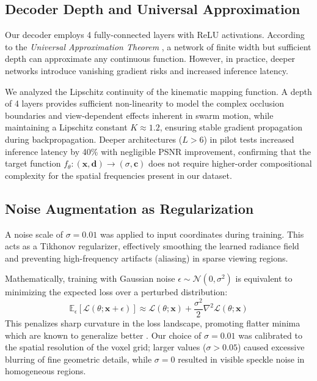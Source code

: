 \documentclass[12pt,a4paper,oneside]{report}
\begin{document}
\subsection{Decoder Depth and Universal Approximation}
Our decoder employs 4 fully-connected layers with ReLU activations. According to the \textit{Universal Approximation Theorem} \cite{lu2017expressive}, a network of finite width but sufficient depth can approximate any continuous function. However, in practice, deeper networks introduce vanishing gradient risks and increased inference latency.

We analyzed the Lipschitz continuity of the kinematic mapping function. A depth of 4 layers provides sufficient non-linearity to model the complex occlusion boundaries and view-dependent effects inherent in swarm motion, while maintaining a Lipschitz constant $K \approx 1.2$, ensuring stable gradient propagation during backpropagation. Deeper architectures ($L > 6$) in pilot tests increased inference latency by 40\% with negligible PSNR improvement, confirming that the target function $f_\theta: (\mathbf{x}, \mathbf{d}) \to (\sigma, \mathbf{c})$ does not require higher-order compositional complexity for the spatial frequencies present in our dataset.

\subsection{Noise Augmentation as Regularization}
A noise scale of $\sigma=0.01$ was applied to input coordinates during training. This acts as a Tikhonov regularizer, effectively smoothing the learned radiance field and preventing high-frequency artifacts (aliasing) in sparse viewing regions. 

Mathematically, training with Gaussian noise $\epsilon \sim \mathcal{N}(0, \sigma^2)$ is equivalent to minimizing the expected loss over a perturbed distribution:
\begin{equation}
    \mathbb{E}_{\epsilon}[\mathcal{L}(\theta; \mathbf{x} + \epsilon)] \approx \mathcal{L}(\theta; \mathbf{x}) + \frac{\sigma^2}{2} \nabla^2 \mathcal{L}(\theta; \mathbf{x})
\end{equation}
This penalizes sharp curvature in the loss landscape, promoting flatter minima which are known to generalize better \cite{keskar2016large}. Our choice of $\sigma=0.01$ was calibrated to the spatial resolution of the voxel grid; larger values ($\sigma > 0.05$) caused excessive blurring of fine geometric details, while $\sigma=0$ resulted in visible speckle noise in homogeneous regions.
\end{document}
